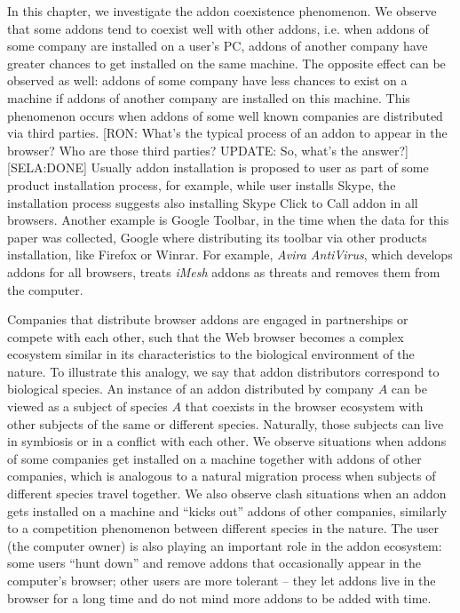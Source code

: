 \documentclass[11pt,oneside]{book}
\begin{document}
In this chapter, we investigate the addon coexistence phenomenon. We observe that some addons tend to coexist well with other addons, i.e. when addons of some company are installed on a user's PC, addons of another company have greater chances to get installed on the same machine. The opposite effect can be observed as well: addons of some company have less chances to exist on a machine if addons of another company are installed on this machine. This phenomenon occurs when addons of some well known companies are distributed via third parties. [RON: What's the typical process of an addon to appear in the browser? Who are those third parties? UPDATE: So, what's the answer?][SELA:DONE]
Usually addon installation is proposed to user as part of some product installation process, for example, while user installs Skype, the installation process suggests also installing Skype Click to Call addon in all browsers. Another example is Google Toolbar, in the time when the data for this paper was collected, Google where distributing its toolbar via other products installation, like Firefox or Winrar.
For example, \emph{Avira AntiVirus}, which develops addons for all browsers, treats \emph{iMesh} addons as threats and removes them from the computer.

Companies that distribute browser addons are engaged in partnerships or compete with each other, such that the Web browser becomes a complex ecosystem similar in its characteristics to the biological environment of the nature. To illustrate this analogy, we say that addon distributors correspond to biological species. An instance of an addon distributed by company $A$ can be viewed as a subject of species $A$ that coexists in the browser ecosystem with other subjects of the same or different species. Naturally, those subjects can live in symbiosis or in a conflict with each other. We observe situations when addons of some companies get installed on a machine together with addons of other companies, which is analogous to a natural migration process when subjects of different species travel together. We also observe clash situations when an addon gets installed on a machine and ``kicks out'' addons of other companies, similarly to a competition phenomenon between different species in the nature. The user (the computer owner) is also playing an important role in the addon ecosystem: some users ``hunt down'' and remove addons that occasionally appear in the computer's browser; other users are more tolerant -- they let addons live in the browser for a long time and do not mind more addons to be added with time.
\end{document}
